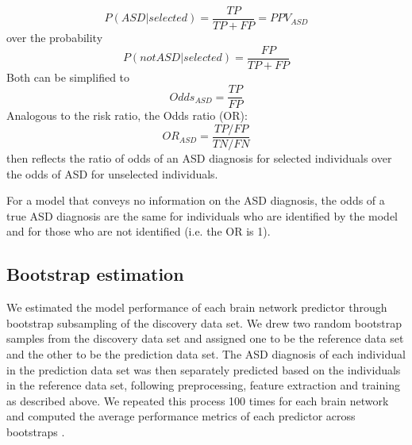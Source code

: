 \documentclass[9pt,lineno]{elife}
\begin{document}
\begin{equation}
\label{eq:prob_ASD}
P(ASD|selected) = \frac{TP}{TP+FP}=PPV_{ASD}
\end{equation}
over the probability
\begin{equation}
\label{eq:prob_notASD}
P(not ASD|selected) = \frac{FP}{TP+FP}
\end{equation}
Both can be simplified to
\begin{equation}
\label{eq:odds_ASD}
Odds_{ASD} = \frac{TP}{FP}
\end{equation}
Analogous to the risk ratio, the Odds ratio (OR):
\begin{equation}
\label{eq:odds_ratio}
OR_{ASD} = \frac{TP/FP}{TN/FN}
\end{equation}
then reflects the ratio of odds of an ASD diagnosis for selected individuals over the odds of ASD for unselected individuals. 

For a model that conveys no information on the ASD diagnosis, the odds of a true ASD diagnosis are the same for individuals who are identified by the model and for those who are not identified (i.e. the OR is 1). 

\subsection{Bootstrap estimation}
We estimated the model performance of each brain network predictor through bootstrap subsampling of the discovery data set. We drew two random bootstrap samples from the discovery data set and assigned one to be the reference data set and the other to be the prediction data set. The ASD diagnosis of each individual in the prediction data set was then separately predicted based on the individuals in the reference data set, following preprocessing, feature extraction and training as described above. We repeated this process 100 times for each brain network and computed the average performance metrics of each predictor across bootstraps \citep[see, e.g.][regarding bootstrap predictor evaluation methods]{Efron1983-ft}.
\end{document}
